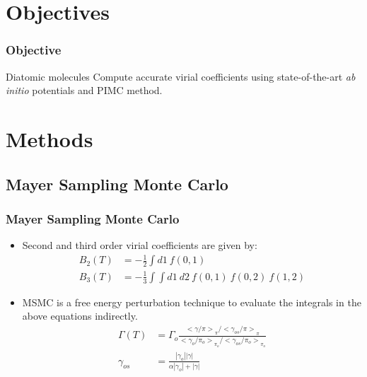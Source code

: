 \documentclass[xcolor=svgnames]{beamer}
\DeclareRobustCommand{\abinitio}[0]{\emph{ab initio}}
\begin{document}
    \section{Objectives}
        \begin{frame}
            \frametitle{Objective}
            \begin{block}{Diatomic molecules}
                Compute accurate virial coefficients using state-of-the-art \abinitio{} potentials and PIMC method.
            \end{block}
        \end{frame}
	\section{Methods}
	\subsection{Mayer Sampling Monte Carlo}
        \begin{frame}
            \frametitle{Mayer Sampling Monte Carlo}
            \begin{itemize}
            \justifying
                \item Second and third order virial coefficients are given by:
                \begin{equation*}
                    \begin{aligned}
                        B_2(T) &= -\frac{1}{2} \displaystyle\int d1 ~ f(0,1)\\
                        B_3(T) &= -\frac{1}{3} \displaystyle\int \int d1~d2~f(0,1)~f(0,2)~f(1,2)
                    \end{aligned}
                \end{equation*}
                \item MSMC is a free energy perturbation technique to evaluate the integrals in the above equations indirectly.
                \begin{equation*}
                    \label{eq:MSMCworking}
                    \begin{aligned}
                        \Gamma (T) &= \Gamma_o \frac{{<\gamma/\pi>}_\pi / {<\gamma_{os}/\pi>}_\pi}{{<\gamma_o/\pi_o>}_{\pi_o} / {<\gamma_{os}/\pi_o>}_{\pi_o}}\\
                        \gamma_{os} &= \frac{|\gamma_o||\gamma|}{\alpha |\gamma_o| + |\gamma|}
                    \end{aligned}
                \end{equation*}
            \end{itemize}
        \end{frame}
\end{document}
